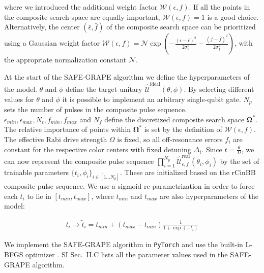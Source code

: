 \documentclass[%
 reprint,
 superscriptaddress,
 amsmath,amssymb,
 aps,
 prx,
]{revtex4-2}
\newcounter{algorithm} %
\begin{document}
where we introduced the additional weight factor $\mathcal{W}(\epsilon,f)$. If all the points in the composite search space are equally important, $\mathcal{W}(\epsilon,f)=1$ is a good choice. Alternatively, the center $(\bar{\epsilon}, \bar{f})$ of the composite search space can be prioritized using a Gaussian weight factor $\mathcal{W}(\epsilon,f)=\mathcal{N} \exp \left( - \frac{(\epsilon - \bar{\epsilon})^2}{2 \sigma_{\epsilon}^2} - \frac{(f - \bar{f})^2}{2 \sigma_{f}^2} \right) $, with the appropriate normalization constant $\mathcal{N}$.

At the start of the SAFE-GRAPE algorithm we define the hyperparameters of the model. $\theta$ and $\phi$ define the target unitary $\hat{\mathcal{U}}^{\text{ideal}}(\theta, \phi)$. By selecting different values for $\theta$ and $\phi$ it is possible to implement an arbitrary single-qubit gate. $N_p$ sets the number of pulses in the composite pulse sequence. $\epsilon_{min},\epsilon_{max},N_{\epsilon},f_{min},f_{max}$ and $N_f$ define the discretized composite search space $\boldsymbol{\Omega^*}$. The relative importance of points within $\boldsymbol{\Omega^*}$ is set by the definition of $\mathcal{W}(\epsilon,f)$. The effective Rabi drive strength $\Omega$ is fixed, so all off-resonance errors $f_i$ are constant for the respective color centers with fixed detuning $\Delta_i$. Since $t=\frac{\theta}{\Omega}$, we can now represent the composite pulse sequence $\prod_{i=1}^{N_p} \hat{\mathcal{U}}_{\epsilon , f}^{\text{real}}(\theta_i, \phi_i)$ by the set of trainable parameters $\{t_i , \phi_i \}_{i\in [1...N_p]}$. These are initialized based on the rCinBB composite pulse sequence. We use a sigmoid re-parametrization in order to force each $t_i$ to lie in $[t_{min}, t_{max}]$, where $t_{min}$ and $t_{max}$ are also hyperparameters of the model:

\begin{align}
    t_i \xrightarrow{} \tilde{t}_i = t_{min} + (t_{max} - t_{min})\frac{1}{1+\exp(-t_i)}
\end{align}

We implement the SAFE-GRAPE algorithm in \texttt{PyTorch} \cite{paszke2019pytorchimperativestylehighperformance} and use the built-in L-BFGS optimizer \cite{Liu1989}. SI Sec.~II.C \cite{googleSI_Programmable_Quantum_Matter_2025Google} lists all the parameter values used in the SAFE-GRAPE algorithm. 
\end{document}
